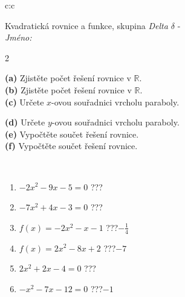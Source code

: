 \documentclass[10pt]{report}
\begin{document}
\begin{tabular}{c:c}
\begin{minipage}[c][104.5mm][t]{0.5\linewidth}
\begin{center}
\vspace{7mm}
{\huge \LARGE Kvadratická rovnice a funkce, skupina \textit{Delta $\delta$} -}\\[5mm]
\textit{Jméno:}\phantom{xxxxxxxxxxxxxxxxxxxxxxxxxxxxxxxxxxxxxxxxxxxxxxxxxxxxxxxxxxxxxxxxx}\\[5mm]
\begin{minipage}{0.95\linewidth}
\begin{center}
{\small \begin{multicols}{2} \raggedright
\textbf{(a)} Zjistěte počet řešení rovnice v \(\mathbb{R}\). \\[1mm]
\textbf{(b)} Zjistěte počet řešení rovnice v \(\mathbb{R}\). \\[1mm]
\textbf{(c)} Určete \(x\)-ovou souřadnici vrcholu paraboly. \par \columnbreak
\textbf{(d)} Určete \(y\)-ovou souřadnici vrcholu paraboly. \\[1mm]
\textbf{(e)} Vypočtěte součet řešení rovnice. \\[1mm]
\textbf{(f)} Vypočtěte součet řešení rovnice.
\end{multicols}
}
\end{center}
\end{minipage}
\\[4mm]
\begin{minipage}{0.79\linewidth}
\begin{center}
\begin{varwidth}{\linewidth}
\begin{enumerate}
\Large
\item $-2x^2-9x-5=0$\quad \dotfill\; ???\;\dotfill {}
\item $-7x^2+4x-3=0$\quad \dotfill\; ???\;\dotfill {}
\item $f(x)=-2x^2-x-1$\quad \dotfill\; ???\;\dotfill \quad $-\frac{1}{4}$
\item $f(x)=2x^2-8x+2$\quad \dotfill\; ???\;\dotfill \quad $-7$
\item $2x^2+2x-4=0$\quad \dotfill\; ???\;\dotfill {}
\item $-x^2-7x-12=0$\quad \dotfill\; ???\;\dotfill \quad $-1$
\end{enumerate}
\end{varwidth}
\end{center}
\end{minipage}

\end{center}
\end{minipage}
\end{tabular}
\end{document}
